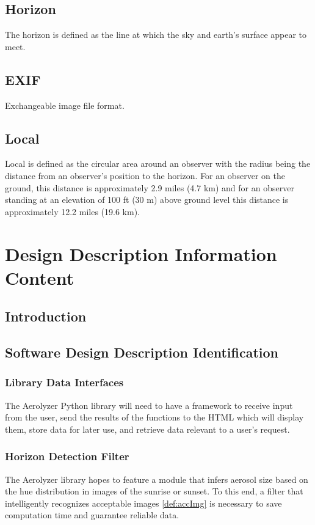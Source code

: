 \documentclass[onecolumn, draftclsnofoot,10pt, compsoc]{IEEEtran}
\begin{document}
\begin{singlespace}
	\subsection{Horizon}\label{def:horizon}
		The horizon is defined as the line at which the sky and earth's surface appear to meet.
	
	\subsection{EXIF}\label{def:exif}
		Exchangeable image file format.
	
	\subsection{Local}\label{def:local}
		Local is defined as the circular area around an observer with the radius being the distance from an observer's position to the horizon.
		For an observer on the ground, this distance is approximately 2.9 miles (4.7 km) and for an observer standing at an elevation of 100 ft (30 m) above ground level this distance is approximately 12.2 miles (19.6 km).

\section{Design Description Information Content}
	\subsection{Introduction}
    
    \subsection{Software Design Description Identification}
    	\subsubsection{Library Data Interfaces}
        The Aerolyzer Python library will need to have a framework to receive input from the user, send the results of the functions to the HTML which will display them, store data for later use, and retrieve data relevant to a user’s request.
        \subsubsection{Horizon Detection Filter}
        The Aerolyzer library hopes to feature a module that infers aerosol size based on the hue distribution in images of the sunrise or sunset. To this end, a filter that intelligently recognizes acceptable images \ref{def:accImg} is necessary to save computation time and guarantee reliable data.

\end{singlespace}
\end{document}
